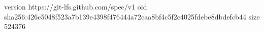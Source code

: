 version https://git-lfs.github.com/spec/v1
oid sha256:426c5048f523a7b139e4398f476444a72caa8bf4c5f2c4025fdebe8dbdefcb44
size 524376
